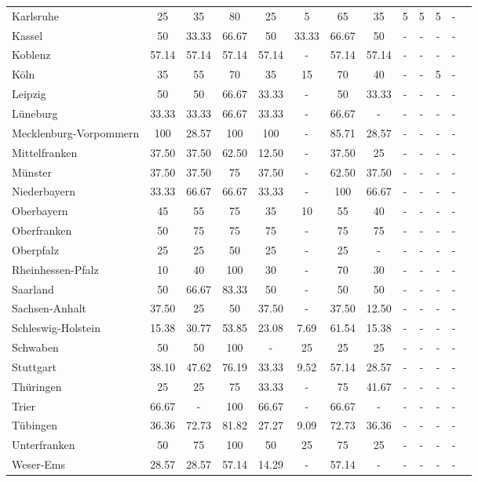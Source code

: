 \begin{table}[H]
\begin{tabularx}{\textwidth}{Xcccccccccccc}
            Karlsruhe & 25 & 35 & 80 & 25 & 5 & 65 & 35 & 5 & 5 & 5 & - \\
            Kassel & 50 & 33.33 & 66.67 & 50 & 33.33 & 66.67 & 50 & - & - & - & - \\
            Koblenz & 57.14 & 57.14 & 57.14 & 57.14 & - & 57.14 & 57.14 & - & - & - & - \\
            Köln & 35 & 55 & 70 & 35 & 15 & 70 & 40 & - & - & 5 & - \\
            Leipzig & 50 & 50 & 66.67 & 33.33 & - & 50 & 33.33 & - & - & - & - \\
            Lüneburg & 33.33 & 33.33 & 66.67 & 33.33 & - & 66.67 & - & - & - & - & - \\
            Mecklenburg-Vorpommern & 100 & 28.57 & 100 & 100 & - & 85.71 & 28.57 & - & - & - & - \\
            Mittelfranken & 37.50 & 37.50 & 62.50 & 12.50 & - & 37.50 & 25 & - & - & - & - \\
            Münster & 37.50 & 37.50 & 75 & 37.50 & - & 62.50 & 37.50 & - & - & - & - \\
            Niederbayern & 33.33 & 66.67 & 66.67 & 33.33 & - & 100 & 66.67 & - & - & - & - \\
            Oberbayern & 45 & 55 & 75 & 35 & 10 & 55 & 40 & - & - & - & - \\
            Oberfranken & 50 & 75 & 75 & 75 & - & 75 & 75 & - & - & - & - \\
            Oberpfalz & 25 & 25 & 50 & 25 & - & 25 & - & - & - & - & - \\
            Rheinhessen-Pfalz & 10 & 40 & 100 & 30 & - & 70 & 30 & - & - & - & - \\
            Saarland & 50 & 66.67 & 83.33 & 50 & - & 50 & 50 & - & - & - & - \\
            Sachsen-Anhalt & 37.50 & 25 & 50 & 37.50 & - & 37.50 & 12.50 & - & - & - & - \\
            Schleswig-Holstein & 15.38 & 30.77 & 53.85 & 23.08 & 7.69 & 61.54 & 15.38 & - & - & - & - \\
            Schwaben & 50 & 50 & 100 & - & 25 & 25 & 25 & - & - & - & - \\
            Stuttgart & 38.10 & 47.62 & 76.19 & 33.33 & 9.52 & 57.14 & 28.57 & - & - & - & - \\
            Thüringen & 25 & 25 & 75 & 33.33 & - & 75 & 41.67 & - & - & - & - \\
            Trier & 66.67 & - & 100 & 66.67 & - & 66.67 & - & - & - & - & - \\
            Tübingen & 36.36 & 72.73 & 81.82 & 27.27 & 9.09 & 72.73 & 36.36 & - & - & - & - \\
            Unterfranken & 50 & 75 & 100 & 50 & 25 & 75 & 25 & - & - & - & - \\
            Weser-Ems & 28.57 & 28.57 & 57.14 & 14.29 & - & 57.14 & - & - & - & - & - \\
        \bottomrule
    \end{tabularx}
\end{table}
    